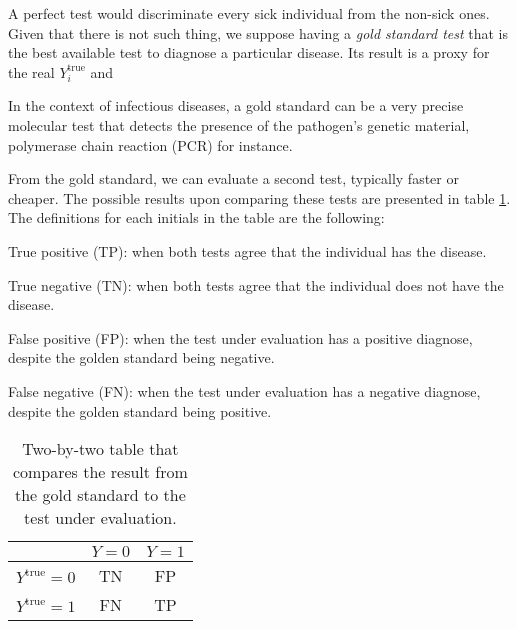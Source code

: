 A perfect test would discriminate every sick individual from the non-sick ones.
Given that there is not such thing, we suppose having a {\em gold standard
test} that is the best available test \cite{versi1992gold} to diagnose a
particular disease. Its result is a proxy for the real $Y^{\mathrm{true}}_i$ and 

\begin{citacao}
  In the context of infectious diseases, a gold standard can be a very precise
  molecular test that detects the presence of the pathogen’s genetic material,
  polymerase chain reaction (PCR) for instance. \cite{bastos2021modelling}
\end{citacao}

From the gold standard, we can evaluate a second test, typically faster or
cheaper. The possible results upon comparing these tests are presented in
table \ref{table:two-by-two}. The definitions for each initials in the table
are the following: 

\begin{alineas}
  \item True positive (TP): when both tests agree that the individual has the
  disease. 
  \item True negative (TN): when both tests agree that the individual does not
  have the disease.
  \item False positive (FP): when the test under evaluation has a positive
  diagnose, despite the golden standard being negative. 
  \item False negative (FN): when the test under evaluation has a negative
  diagnose, despite the golden standard being positive.
\end{alineas}

\begin{table}[!ht]
  \centering
  \begin{tabular}{c|c|c|}
  \cline{2-3}
                                               & $Y = 0$ & $Y = 1$ \\ \hline
  \multicolumn{1}{|c|}{$Y^{\mathrm{true}}= 0$} & TN    & FP    \\ \hline
  \multicolumn{1}{|c|}{$Y^{\mathrm{true}}= 1$} & FN    & TP    \\ \hline
  \end{tabular}
  \caption{Two-by-two table that compares the result from the gold standard to
  the test under evaluation.}
  \label{table:two-by-two}
\end{table}

